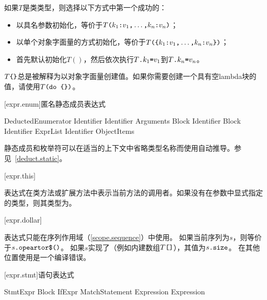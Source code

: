 \pnum
如果$T$是类类型，则选择以下方式中第一个成功的：

\begin{itemize}
    \item 以具名参数初始化，等价于$T\texttt{(}k_1\texttt{:}v_1\texttt{,}\ldots\texttt{,}k_n\texttt{:}v_n\texttt{)}$；
    \item 以单个对象字面量的方式初始化，等价于$T\texttt{(\{}k_1\texttt{:}v_1\texttt{,}\ldots\texttt{,}k_n\texttt{:}v_n\texttt{\})}$；
    \item 首先默认初始化$T()$，然后依次执行$T\texttt{.}k_1\texttt{=}v_1$到$T\texttt{.}k_n\texttt{=}v_n$。
\end{itemize}

\pnum
$T\texttt{\{\}}$总是被解释为以对象字面量创建值。\enternote 如果你需要创建一个具有空lambda块的值，请使用$T\texttt{(do \{\})}$。\exitnote

[expr.enum]{匿名静态成员表达式}

\begin{bnf}{DeductedEnumerator}
     Identifier \br
     Identifier \terminal{(} Arguments\bnfq \terminal{)} Block\bnfs \br
     Identifier Block \br
     Identifier \terminal{[} ExprList\bnfq \terminal{]} \br
     Identifier \terminal{\{} ObjectItems\bnfq \terminal{\}}
\end{bnf}

\pnum
静态成员和枚举符可以在适当的上下文中省略类型名称而使用自动推导。参见~\ref{deduct.static}。

[expr.this]{}

\pnum
表达式在类方法或扩展方法中表示当前方法的调用者。如果没有在参数中显式指定的类型，则其类型为。

[expr.dollar]{\tcode{\$}}

\pnum
表达式\tcode{\$}只能在序列作用域（\ref{scope.sequence}）中使用。
如果当前序列为$s$，则\tcode{\$}等价于$s\texttt{.opeartor\$()}$。
如果$s$实现了（例如内建数组$T\texttt{[]}$），其值为$s\texttt{.size}$。
在其他位置使用\tcode{\$}是一个编译错误。

[expr.stmt]{语句表达式}

\begin{bnf}{StmtExpr}
    Block \br
    IfExpr \br
    MatchStatement \br
     \br
     \br
     Expression\bnfq \br
     Expression\bnfq
\end{bnf}

